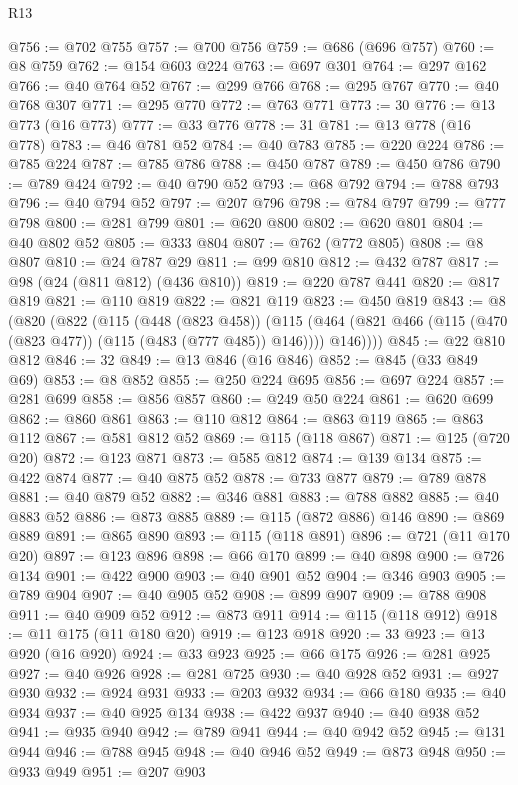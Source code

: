 \begin{lexlean}{R13}
\begin{coremodule}
@756 := @702 @755
@757 := @700 @756
@759 := @686 (@696 @757)
@760 := @8 @759
@762 := @154 @603 @224
@763 := @697 @301
@764 := @297 @162
@766 := @40 @764 @52
@767 := @299 @766
@768 := @295 @767
@770 := @40 @768 @307
@771 := @295 @770
@772 := @763 @771
@773 := 30
@776 := @13 @773 (@16 @773)
@777 := @33 @776
@778 := 31
@781 := @13 @778 (@16 @778)
@783 := @46 @781 @52
@784 := @40 @783
@785 := @220 @224
@786 := @785 @224
@787 := @785 @786
@788 := @450 @787
@789 := @450 @786
@790 := @789 @424
@792 := @40 @790 @52
@793 := @68 @792
@794 := @788 @793
@796 := @40 @794 @52
@797 := @207 @796
@798 := @784 @797
@799 := @777 @798
@800 := @281 @799
@801 := @620 @800
@802 := @620 @801
@804 := @40 @802 @52
@805 := @333 @804
@807 := @762 (@772 @805)
@808 := @8 @807
@810 := @24 @787 @29
@811 := @99 @810
@812 := @432 @787
@817 := @98 (@24 (@811 @812) (@436 @810))
@819 := @220 @787 @441
@820 := @817 @819
@821 := @110 @819
@822 := @821 @119
@823 := @450 @819
@843 := @8
    (@820
      (@822
        (@115
          (@448 (@823 @458))
          (@115 (@464 (@821 @466 (@115 (@470 (@823 @477)) (@115 (@483 (@777 @485)) @146)))) @146))))
@845 := @22 @810 @812
@846 := 32
@849 := @13 @846 (@16 @846)
@852 := @845 (@33 @849 @69)
@853 := @8 @852
@855 := @250 @224 @695
@856 := @697 @224
@857 := @281 @699
@858 := @856 @857
@860 := @249 @50 @224
@861 := @620 @699
@862 := @860 @861
@863 := @110 @812
@864 := @863 @119
@865 := @863 @112
@867 := @581 @812 @52
@869 := @115 (@118 @867)
@871 := @125 (@720 @20)
@872 := @123 @871
@873 := @585 @812
@874 := @139 @134
@875 := @422 @874
@877 := @40 @875 @52
@878 := @733 @877
@879 := @789 @878
@881 := @40 @879 @52
@882 := @346 @881
@883 := @788 @882
@885 := @40 @883 @52
@886 := @873 @885
@889 := @115 (@872 @886) @146
@890 := @869 @889
@891 := @865 @890
@893 := @115 (@118 @891)
@896 := @721 (@11 @170 @20)
@897 := @123 @896
@898 := @66 @170
@899 := @40 @898
@900 := @726 @134
@901 := @422 @900
@903 := @40 @901 @52
@904 := @346 @903
@905 := @789 @904
@907 := @40 @905 @52
@908 := @899 @907
@909 := @788 @908
@911 := @40 @909 @52
@912 := @873 @911
@914 := @115 (@118 @912)
@918 := @11 @175 (@11 @180 @20)
@919 := @123 @918
@920 := 33
@923 := @13 @920 (@16 @920)
@924 := @33 @923
@925 := @66 @175
@926 := @281 @925
@927 := @40 @926
@928 := @281 @725
@930 := @40 @928 @52
@931 := @927 @930
@932 := @924 @931
@933 := @203 @932
@934 := @66 @180
@935 := @40 @934
@937 := @40 @925 @134
@938 := @422 @937
@940 := @40 @938 @52
@941 := @935 @940
@942 := @789 @941
@944 := @40 @942 @52
@945 := @131 @944
@946 := @788 @945
@948 := @40 @946 @52
@949 := @873 @948
@950 := @933 @949
@951 := @207 @903

\end{coremodule}
\end{lexlean}
